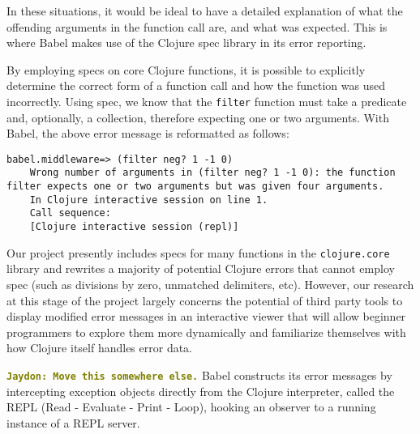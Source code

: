 \documentclass[12pt]{article}
\newcommand{\comment}[1]{{\bf \tt  {#1}}}
\newcommand{\jscomment}[1]{\textcolor{olive}{\comment{Jaydon: {#1}}}}
\begin{document}
In these situations, it would be ideal to have a detailed explanation of what the offending arguments in the function call are, and what was expected. This is where Babel makes use of the Clojure spec library in its error reporting.

By employing specs on core Clojure functions, it is possible to explicitly determine the correct form of a function call and how the function was used incorrectly. Using spec, we know that the \verb|filter| function must take a predicate and, optionally, a collection, therefore expecting one or two arguments. With Babel, the above error message is reformatted as follows:

\begin{lstlisting}[breaklines=true, basicstyle=\ttfamily]
    babel.middleware=> (filter neg? 1 -1 0)
    Wrong number of arguments in (filter neg? 1 -1 0): the function filter expects one or two arguments but was given four arguments.
    In Clojure interactive session on line 1.
    Call sequence:
    [Clojure interactive session (repl)]
\end{lstlisting}

Our project presently includes specs for many functions in the \verb|clojure.core| library and rewrites a majority of potential Clojure errors that cannot employ spec (such as divisions by zero, unmatched delimiters, etc). However, our research at this stage of the project largely concerns the potential of third party tools to display modified error messages in an interactive viewer that will allow beginner programmers to explore them more dynamically and familiarize themselves with how Clojure itself handles error data.

\jscomment{Move this somewhere else.}
Babel constructs its error messages by intercepting exception objects directly from the Clojure interpreter, called the REPL (Read - Evaluate - Print - Loop), hooking an observer to a running instance of a REPL server.
\end{document}
